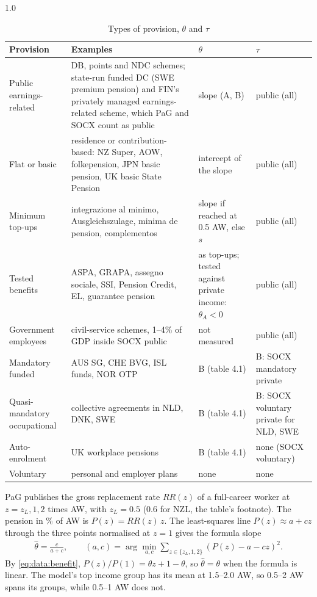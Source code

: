 \begin{table}[htbp]
\centering
\caption{Types of provision, $\theta$ and $\tau$}\label{tab:data:tiers}
\begin{spacing}{1.0}
\footnotesize
\begin{tabular}{@{}>{\raggedright\arraybackslash}p{2.9cm}>{\raggedright\arraybackslash}p{\dimexpr\linewidth-8.1cm-6\tabcolsep\relax}>{\raggedright\arraybackslash}p{2.6cm}>{\raggedright\arraybackslash}p{2.6cm}@{}}
\toprule
Provision & Examples & $\theta$ & $\tau$ \\
\midrule
Public earnings-related & DB, points and NDC schemes; state-run funded DC (SWE premium pension) and FIN's privately managed earnings-related scheme, which PaG and SOCX count as public & slope (A, B) & public (all) \\
Flat or basic & residence or contribution-based: NZ Super, AOW, folkepension, JPN basic pension, UK basic State Pension & intercept of the slope & public (all) \\
Minimum top-ups & integrazione al minimo, Ausgleichszulage, minima de pension, complementos & slope if reached at 0.5 AW, else $s$ & public (all) \\
Tested benefits & ASPA, GRAPA, assegno sociale, SSI, Pension Credit, EL, guarantee pension & as top-ups; tested against private income: $\theta_A<0$ & public (all) \\
Government employees & civil-service schemes, 1--4\% of GDP inside SOCX public & not measured & public (all) \\
Mandatory funded & AUS SG, CHE BVG, ISL funds, NOR OTP & B (table 4.1) & B: SOCX mandatory private \\
Quasi-mandatory occupational & collective agreements in NLD, DNK, SWE & B (table 4.1) & B: SOCX voluntary private for NLD, SWE \\
Auto-enrolment & UK workplace pensions & B (table 4.1) & none (SOCX voluntary) \\
Voluntary & personal and employer plans & none & none \\
\bottomrule
\end{tabular}
\end{spacing}
\end{table}

PaG publishes the gross replacement rate $RR(z)$ of a full-career worker at $z = z_L, 1, 2$ times AW, with $z_L = 0.5$ ($0.6$ for NZL, the table's footnote). The pension in \% of AW is $P(z) = RR(z)\,z$. The least-squares line $P(z) \approx a + c z$ through the three points normalised at $z = 1$ gives the formula slope
\begin{align}
    \hat\theta = \frac{c}{a+c}, \qquad (a, c) = \arg\min_{a,c}\sum_{z\in\{z_L,1,2\}}\left(P(z) - a - cz\right)^2. \label{eq:data:slope}
\end{align}
By \cref{eq:data:benefit}, $P(z)/P(1) = \theta z + 1 - \theta$, so $\hat\theta = \theta$ when the formula is linear. The model's top income group has its mean at 1.5--2.0 AW, so 0.5--2 AW spans its groups, while 0.5--1 AW does not.

